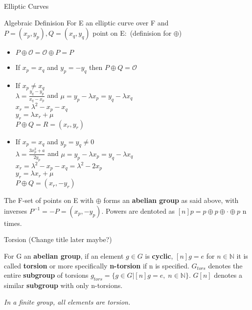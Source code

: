 \documentclass[12pt, letterpaper]{article}
\begin{document}
\begin{section}{Elliptic Curves}
\begin{subsection}{Algebraic Definision}
    For E an elliptic curve over F and \(P = (x_{p}, y_{p}),
    Q = (x_{q}, y_{q})\) point on E:\ (definision for \(\oplus\))
    \begin{itemize}
      \item \(P \oplus \mathcal{O} = \mathcal{O} \oplus P = P\)
      \item If \(x_{p} = x_{q}\) and \(y_{p} = -y_{q}\) then
            \(P \oplus Q = \mathcal{O}\)
      \item If \(x_{p} \neq x_{q}\) \\
            \(\lambda = \frac{y_{q} - y_{p}}{x_{q} - x_{p}}\) and
            \(\mu = y_{p} - \lambda x_{p} = y_{q} - \lambda x_{q}\) \\
            \(x_{r} = \lambda^{2} - x_{p} - x_{q}\) \\
            \(y_{r} = \lambda x_{r} + \mu\) \\
            \(P \oplus Q = R = (x_{r}, y_{r})\)
      \item If \(x_{p} = x_{q}\) and \(y_{p} = y_{q} \neq 0\) \\
            \(\lambda = \frac{3x^{2}_{p} + a}{2y_{p}}\) and
            \(\mu = y_{p} - \lambda x_{p} = y_{q} - \lambda x_{q}\) \\
            \(x_{r} = \lambda^{2} - x_{p} - x_{q} = \lambda^{2} - 2x_{p}\) \\
            \(y_{r} = \lambda x_{r} + \mu\) \\
            \(P \oplus Q = (x_{r}, -y_{r})\)
    \end{itemize}

    The F-set of points on E with \(\oplus\) forms an \textbf{abelian group} as
    said above, with inverses \(P^{-1} = -P = (x_{p}, -y_{p})\). Powers are
    dentoted as \([n]p = p \oplus p \oplus \cdot \oplus p\) n times.

  \end{subsection}

  \begin{subsection}{Torsion (Change title later maybe?)}

    For G an \textbf{abelian group}, if an element \(g \in G\) is
    \textbf{cyclic}, \([n]g = e\) for \(n \in \mathbb{N}\) it is called
    \textbf{torsion} or more specifically \textbf{n-torsion} if n is specified.
    \(G_{tors}\) denotes the entire \textbf{subgroup} of torsions
    \(g_{tors} = \{g \in G | [n]g = e, \; n \in \mathbb{N}\}\). \(G[n]\)
    denotes a similar \textbf{subgroup} with only n-torsions.

    \textit{In a finite group, all elements are torsion.}


\end{subsection}
\end{section}
\end{document}

